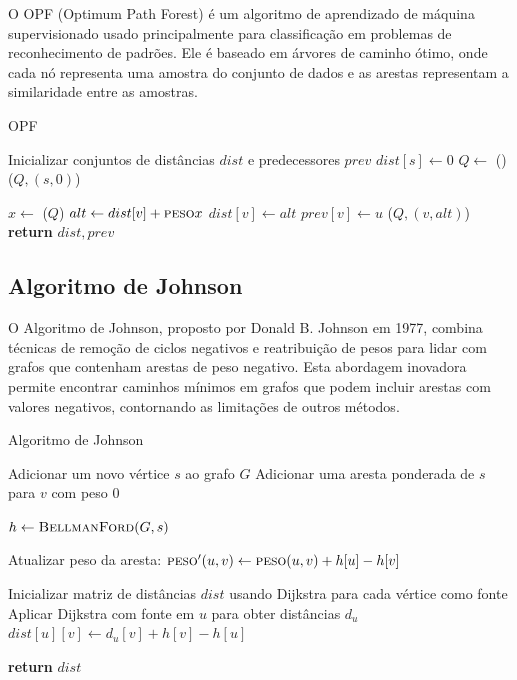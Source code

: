 \documentclass[12pt]{article}
\begin{document}
O OPF (Optimum Path Forest) é um algoritmo de aprendizado de máquina supervisionado usado principalmente para classificação em problemas de reconhecimento de padrões. Ele é baseado em árvores de caminho ótimo, onde cada nó representa uma amostra do conjunto de dados e as arestas representam a similaridade entre as amostras.

\begin{algorithm}[H]
\caption{OPF}
\begin{algorithmic}[4]
  \State Inicializar conjuntos de distâncias $dist$ e predecessores $prev$
  \State $dist[s] \gets 0$
  \State $Q \gets$ ()
  \State {}($Q, (s, 0)$)

    \State $x \gets$ ($Q$)
      \State $alt \gets dist[v] + \textproc{peso}x$
        \State $dist[v] \gets alt$
        \State $prev[v] \gets u$
        \State {}($Q, (v, alt)$)
      \EndIf
    \EndFor
  \EndWhile
  \State \textbf{return} $dist, prev$
\EndProcedure
\end{algorithmic}
\end{algorithm}
\subsection{Algoritmo de Johnson}

O Algoritmo de Johnson, proposto por Donald B. Johnson em 1977, combina técnicas de remoção de ciclos negativos e reatribuição de pesos para lidar com grafos que contenham arestas de peso negativo. Esta abordagem inovadora permite encontrar caminhos mínimos em grafos que podem incluir arestas com valores negativos, contornando as limitações de outros métodos.

\begin{algorithm}[H]
\caption{Algoritmo de Johnson}
\begin{algorithmic}[5]
  \State Adicionar um novo vértice $s$ ao grafo $G$
    \State Adicionar uma aresta ponderada de $s$ para $v$ com peso $0$
  \EndFor

  \State $h \gets \textproc{BellmanFord}(G, s)$
  
    \State Atualizar peso da aresta: $\textproc{peso}'(u, v) \gets \textproc{peso}(u, v) + h[u] - h[v]$
  \EndFor

  \State Inicializar matriz de distâncias $dist$ usando Dijkstra para cada vértice como fonte
    \State Aplicar Dijkstra com fonte em $u$ para obter distâncias $d_u$
      \State $dist[u][v] \gets d_u[v] + h[v] - h[u]$
    \EndFor
  \EndFor

  \State \textbf{return} $dist$
\EndProcedure
\end{algorithmic}
\end{algorithm}
\end{document}
